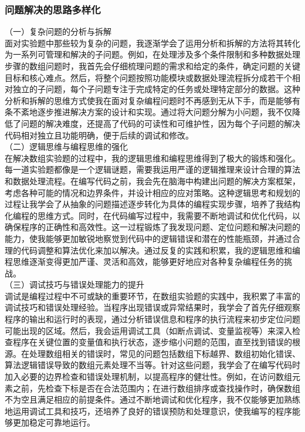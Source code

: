\documentclass[supercite]{Experimental_Report}
\theoremstyle{definition}
\begin{document}
		\subsubsection{问题解决的思路多样化}
		（一）复杂问题的分析与拆解\\
		面对实验题中那些较为复杂的问题，我逐渐学会了运用分析和拆解的方法将其转化为一系列可管理和解决的子问题。例如，在处理涉及多个条件限制和多种数据处理步骤的数组问题时，我首先会仔细梳理问题的需求和给定的条件，确定问题的关键目标和核心难点。然后，将整个问题按照功能模块或数据处理流程拆分成若干个相对独立的子问题，每个子问题专注于完成特定的任务或处理特定部分的数据。这种分析和拆解的思维方式使我在面对复杂编程问题时不再感到无从下手，而是能够有条不紊地逐步推进解决方案的设计和实现。通过将大问题分解为小问题，我不仅降低了问题的解决难度，还提高了代码的可读性和可维护性，因为每个子问题的解决代码相对独立且功能明确，便于后续的调试和修改。\\
		（二）逻辑思维与编程思维的强化\\
		在解决数组实验题的过程中，我的逻辑思维和编程思维得到了极大的锻炼和强化。每一道实验题都像是一个逻辑谜题，需要我运用严谨的逻辑推理来设计合理的算法和数据处理流程。在编写代码之前，我会先在脑海中构建出问题的解决方案框架，考虑各种可能的情况和边界条件，并设计相应的应对策略。这种逻辑思考和规划的过程让我学会了从抽象的问题描述逐步转化为具体的编程实现步骤，培养了我结构化编程的思维方式。同时，在代码编写过程中，我需要不断地调试和优化代码，以确保程序的正确性和高效性。这一过程锻炼了我发现问题、定位问题和解决问题的能力，使我能够更加敏锐地察觉到代码中的逻辑错误和潜在的性能瓶颈，并通过合理的代码调整和算法优化来加以解决。通过反复的实践和积累，我的逻辑思维和编程思维逐渐变得更加严谨、灵活和高效，能够更好地应对各种复杂编程任务的挑战。\\
		（三）调试技巧与错误处理能力的提升\\
		调试是编程过程中不可或缺的重要环节，在数组实验题的实践中，我积累了丰富的调试技巧和错误处理经验。当程序出现错误或异常结果时，我学会了首先仔细观察程序的输出和运行时的表现，通过分析错误信息和程序的执行流程来初步定位问题可能出现的区域。然后，我会运用调试工具（如断点调试、变量监视等）来深入检查程序在关键位置的变量值和执行状态，逐步缩小问题的范围，直至找到错误的根源。在处理数组相关的错误时，常见的问题包括数组下标越界、数组初始化错误、算法逻辑错误导致的数组元素处理不当等。针对这些问题，我学会了在编写代码时加入必要的边界检查和错误处理机制，以提高程序的健壮性。例如，在访问数组元素之前，先检查下标是否在合法范围内；在进行数组排序或查找操作时，确保数组不为空且满足相应的前提条件。通过不断地调试和优化程序，我不仅能够更加熟练地运用调试工具和技巧，还培养了良好的错误预防和处理意识，使我编写的程序能够更加稳定可靠地运行。
\end{document}
